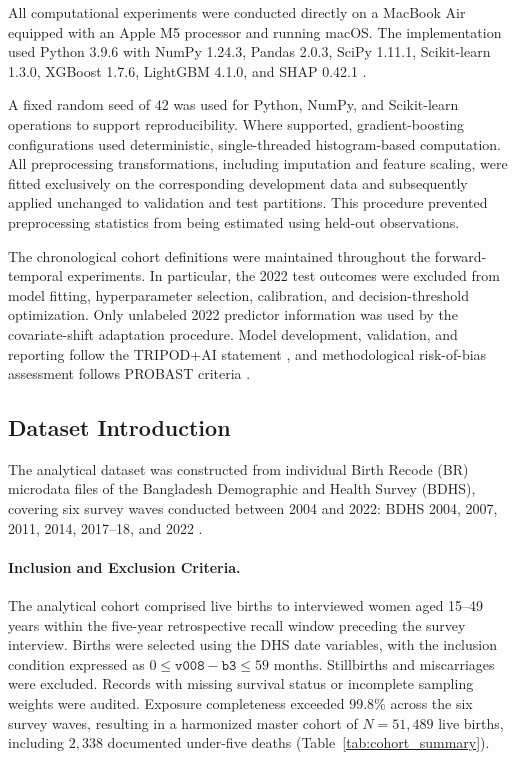 \documentclass[a4paper,fleqn]{cas-sc}
\begin{document}
All computational experiments were conducted directly on a MacBook Air equipped with an Apple M5 processor and running macOS. The implementation used Python 3.9.6 with NumPy 1.24.3, Pandas 2.0.3, SciPy 1.11.1, Scikit-learn 1.3.0, XGBoost 1.7.6, LightGBM 4.1.0, and SHAP 0.42.1 \cite{lundberg2017}.

A fixed random seed of $42$ was used for Python, NumPy, and Scikit-learn operations to support reproducibility. Where supported, gradient-boosting configurations used deterministic, single-threaded histogram-based computation. All preprocessing transformations, including imputation and feature scaling, were fitted exclusively on the corresponding development data and subsequently applied unchanged to validation and test partitions. This procedure prevented preprocessing statistics from being estimated using held-out observations.

The chronological cohort definitions were maintained throughout the forward-temporal experiments. In particular, the 2022 test outcomes were excluded from model fitting, hyperparameter selection, calibration, and decision-threshold optimization. Only unlabeled 2022 predictor information was used by the covariate-shift adaptation procedure. Model development, validation, and reporting follow the TRIPOD+AI statement \cite{collins2024}, and methodological risk-of-bias assessment follows PROBAST criteria \cite{wolff2019}.

\subsection{Dataset Introduction}
\label{sec:exp_dataset}

The analytical dataset was constructed from individual Birth Recode (BR) microdata files of the Bangladesh Demographic and Health Survey (BDHS), covering six survey waves conducted between 2004 and 2022: BDHS 2004, 2007, 2011, 2014, 2017--18, and 2022 \cite{niport2024}.

\paragraph{Inclusion and Exclusion Criteria.}
The analytical cohort comprised live births to interviewed women aged 15--49 years within the five-year retrospective recall window preceding the survey interview. Births were selected using the DHS date variables, with the inclusion condition expressed as $0 \leq \texttt{v008}-\texttt{b3}\leq59$ months. Stillbirths and miscarriages were excluded. Records with missing survival status or incomplete sampling weights were audited. Exposure completeness exceeded 99.8\% across the six survey waves, resulting in a harmonized master cohort of $N=51{,}489$ live births, including $2{,}338$ documented under-five deaths (Table~\ref{tab:cohort_summary}).
\end{document}
